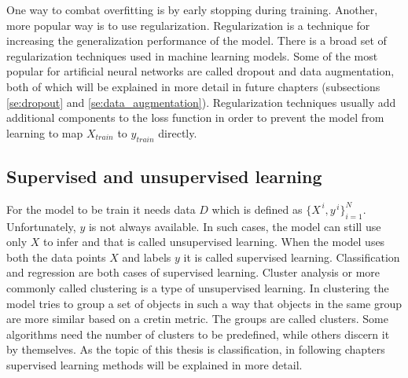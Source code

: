 \documentclass[times, utf8, diplomski]{fer}
\begin{document}
One way to combat overfitting is by early stopping during training. Another, more popular way is to use regularization. Regularization is a technique for increasing the generalization performance of the model. There is a broad set of regularization techniques used in machine learning models. Some of the most popular for artificial neural networks are called dropout \citep{srivastava_dropout:_2014} and data augmentation, both of which will be explained in more detail in future chapters (subsections \ref{se:dropout} and \ref{se:data_augmentation}). Regularization techniques usually add additional components to the loss function in order to prevent the model from learning to map $X_{train}$ to $y_{train}$ directly.


\subsection{Supervised and unsupervised learning}
For the model to be train it needs data $D$ which is defined as $\{{X}^{\,i},y^{\,i}\}^{N}_{i=1}$. Unfortunately, $y$ is not always available. In such cases, the model can still use only $X$ to infer and that is called unsupervised learning. When the model uses both the data points $X$ and labels $y$ it is called supervised learning. Classification and regression are both cases of supervised learning. Cluster analysis or more commonly called clustering is a type of unsupervised learning. In clustering the model tries to group a set of objects in such a way that objects in the same group are more similar based on a cretin metric. The groups are called clusters. Some algorithms need the number of clusters to be predefined, while others discern it by themselves. As the topic of this thesis is classification, in following chapters supervised learning methods will be explained in more detail.
\end{document}
